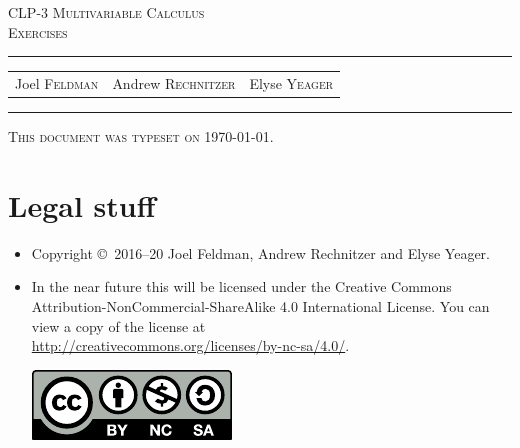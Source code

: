 \documentclass[12pt,letterpaper, openany]{book}
\makeatletter
\newcommand{\reqnomode}{\tagsleft@false}
\makeatother
\begin{document}
\reqnomode

\setcounter{page}{0}

\begin{titlepage} 
\begin{center} 
\textsc{\LARGE
CLP-3 Multivariable Calculus\\[2ex]
Exercises
}\\[2ex]

\vspace{5ex}
\hrule
\vspace{5ex}

\begin{tabular}{ccc}
\large  Joel \textsc{Feldman}  
& \large \qquad Andrew \textsc{Rechnitzer} 
&\large  \qquad Elyse \textsc{Yeager}
\end{tabular}

\end{center}
\vspace{2ex}
\hrule

\vfill
\textsc{This document was typeset on \today.}
\end{titlepage}

\section*{Legal stuff}
\begin{itemize}
 \item Copyright \copyright\ 2016--20 Joel Feldman, Andrew Rechnitzer and Elyse Yeager.

\item In the near future this will be licensed under the 
Creative Commons Attribution-NonCommercial-ShareAlike 4.0 International 
License. You can view a copy of the license at \\
\url{http://creativecommons.org/licenses/by-nc-sa/4.0/}.
\begin{center}
 \includegraphics{figures/by-nc-sa.pdf}
\end{center}
\end{itemize}

\newpage
\end{document}
